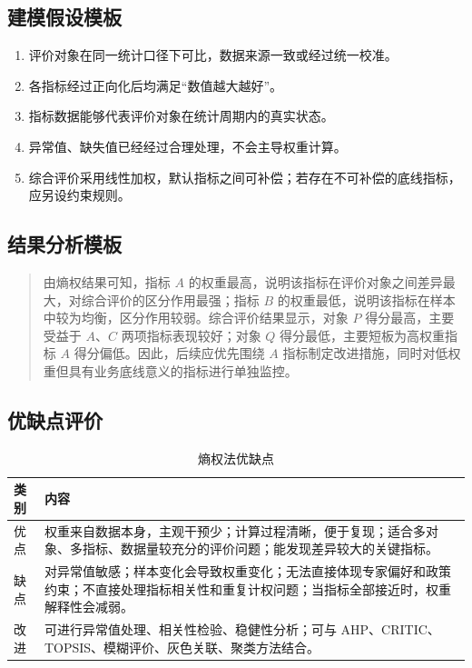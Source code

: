 \documentclass[UTF8,zihao=-4]{ctexart}
\begin{document}
\subsection{建模假设模板}
\begin{enumerate}
  \item 评价对象在同一统计口径下可比，数据来源一致或经过统一校准。
  \item 各指标经过正向化后均满足“数值越大越好”。
  \item 指标数据能够代表评价对象在统计周期内的真实状态。
  \item 异常值、缺失值已经经过合理处理，不会主导权重计算。
  \item 综合评价采用线性加权，默认指标之间可补偿；若存在不可补偿的底线指标，应另设约束规则。
\end{enumerate}

\subsection{结果分析模板}
\begin{quote}
由熵权结果可知，指标 $A$ 的权重最高，说明该指标在评价对象之间差异最大，对综合评价的区分作用最强；指标 $B$ 的权重最低，说明该指标在样本中较为均衡，区分作用较弱。综合评价结果显示，对象 $P$ 得分最高，主要受益于 $A$、$C$ 两项指标表现较好；对象 $Q$ 得分最低，主要短板为高权重指标 $A$ 得分偏低。因此，后续应优先围绕 $A$ 指标制定改进措施，同时对低权重但具有业务底线意义的指标进行单独监控。
\end{quote}

\subsection{优缺点评价}

\begin{table}[H]
\centering
\caption{熵权法优缺点}
\begin{tabularx}{\textwidth}{p{2.6cm}X}
\toprule
类别 & 内容 \\
\midrule
优点 & 权重来自数据本身，主观干预少；计算过程清晰，便于复现；适合多对象、多指标、数据量较充分的评价问题；能发现差异较大的关键指标。 \\
缺点 & 对异常值敏感；样本变化会导致权重变化；无法直接体现专家偏好和政策约束；不直接处理指标相关性和重复计权问题；当指标全部接近时，权重解释性会减弱。 \\
改进 & 可进行异常值处理、相关性检验、稳健性分析；可与 AHP、CRITIC、TOPSIS、模糊评价、灰色关联、聚类方法结合。 \\
\bottomrule
\end{tabularx}
\end{table}
\end{document}
